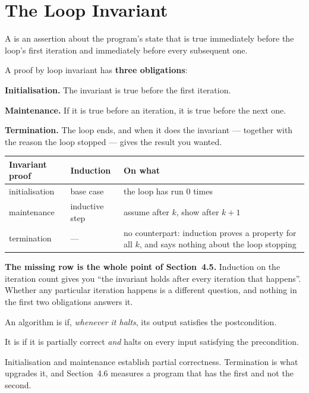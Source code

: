 \section{The Loop Invariant}

\begin{definitionbox}
A  is an assertion about the program's state that is true
immediately before the loop's first iteration and immediately before every
subsequent one.

\smallskip
A proof by loop invariant has \textbf{three obligations}:

\begin{tightnum}
  \item \textbf{Initialisation.} The invariant is true before the first
        iteration.
  \item \textbf{Maintenance.} If it is true before an iteration, it is true
        before the next one.
  \item \textbf{Termination.} The loop ends, and when it does the invariant ---
        together with the reason the loop stopped --- gives the result you
        wanted.
\end{tightnum}
\end{definitionbox}

\begin{conceptbox}
\begin{longtable}{@{}L{4.0cm}L{4.0cm}L{6.0cm}@{}}
\toprule
{}
\textbf{Invariant proof} & \textbf{Induction} & \textbf{On what} \\
\midrule
\endhead
initialisation & base case & the loop has run 0 times \\
maintenance & inductive step & assume after $k$, show after $k+1$ \\
termination & --- & no counterpart: induction proves a property for all $k$,
  and says nothing about the loop stopping \\
\bottomrule
\end{longtable}

\smallskip
\textbf{The missing row is the whole point of Section~4.5.} Induction on the
iteration count gives you ``the invariant holds after every iteration that
happens''. Whether any particular iteration happens is a different question,
and nothing in the first two obligations answers it.
\end{conceptbox}

\begin{definitionbox}
An algorithm is  if, \emph{whenever it halts}, its
output satisfies the postcondition.

\smallskip
It is  if it is partially correct \emph{and} halts on
every input satisfying the precondition.

\smallskip
Initialisation and maintenance establish partial correctness. Termination is
what upgrades it, and Section~4.6 measures a program that has the first and not
the second.
\end{definitionbox}


